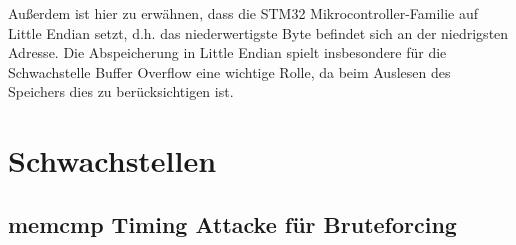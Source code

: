 \documentclass[a4paper,
DIV=13,
12pt,
BCOR=10mm,
department=FakIM,
oneside,
parskip=half,
automark,
listof=totocnumbered,
bibliography=totocnumbered,
acronym=totocnumbered
] {OTHRartcl}
\begin{document}
Außerdem ist hier zu erwähnen, dass die STM32 Mikrocontroller-Familie auf Little Endian setzt, d.h. das niederwertigste Byte befindet sich an der niedrigsten Adresse.
Die Abspeicherung in Little Endian spielt insbesondere für die Schwachstelle Buffer Overflow eine wichtige Rolle, da beim Auslesen des
Speichers dies zu berücksichtigen ist.




\section{Schwachstellen}
\subsection{memcmp Timing Attacke für Bruteforcing}
\end{document}

